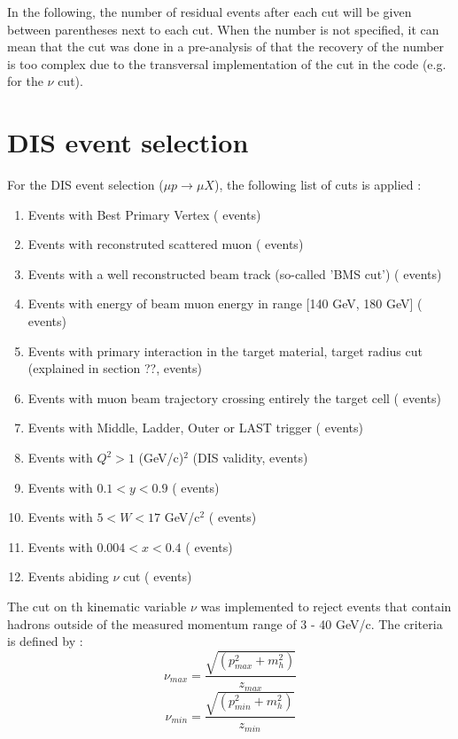 In the following, the number of residual events after each cut will be given between parentheses next to each cut.
When the number is not specified, it can mean that the cut was done in a pre-analysis of that the recovery of the
number is too complex due to the transversal implementation of the cut in the code (e.g. for the $\nu$ cut).


\section{DIS event selection}

For the DIS event selection ($\mu p \rightarrow \mu X$), the following list of cuts is applied :
\begin{enumerate}
  \item Events with Best Primary Vertex ( events)
  \item Events with reconstruted scattered muon ( events)
  \item Events with a well reconstructed beam track (so-called 'BMS cut') ( events)
  \item Events with energy of beam muon energy in range [140 GeV, 180 GeV] ( events)
  \item Events with primary interaction in the target material, target radius cut (explained in section ??, events)
  \item Events with muon beam trajectory crossing entirely the target cell ( events)
  \item Events with Middle, Ladder, Outer or LAST trigger ( events)
  \item Events with $Q^2>1$ (GeV/c)$^2$ (DIS validity, events)
  \item Events with $0.1 < y < 0.9$ ( events)
  \item Events with $5 < W < 17$ GeV/c$^2$ ( events)
  \item Events with $0.004 < x < 0.4$ ( events)
  \item Events abiding $\nu$ cut ( events)
\end{enumerate}

The cut on th kinematic variable $\nu$ was implemented to reject events that contain hadrons outside of the measured
momentum range of 3 - 40 GeV/c. The criteria is defined by :
\begin{equation}
  \nu_{max} = \frac{\sqrt{(p^2_{max}+m^2_h)}}{z_{max}}
\end{equation}
\begin{equation}
  \nu_{min} = \frac{\sqrt{(p^2_{min}+m^2_h)}}{z_{min}}
\end{equation}

